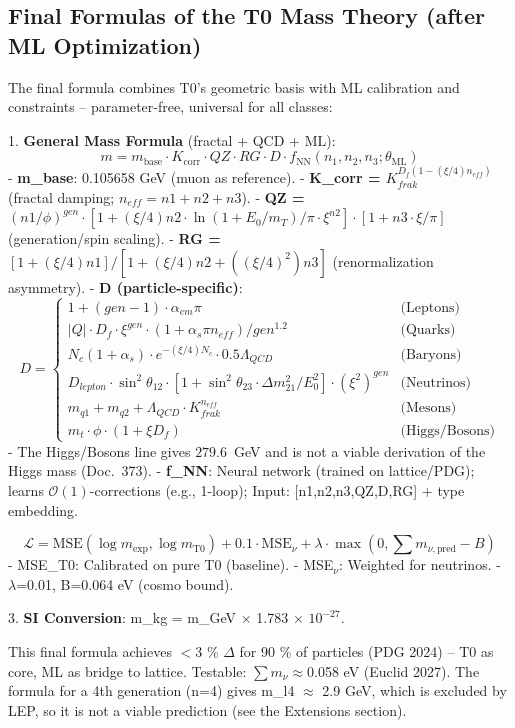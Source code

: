 	\subsection*{Final Formulas of the T0 Mass Theory (after ML Optimization)}
	The final formula combines T0's geometric basis with ML calibration and constraints – parameter-free, universal for all classes:
	
	1. \textbf{General Mass Formula} (fractal + QCD + ML):
	\[
	\boxed{m = m_{\text{base}} \cdot K_{\text{corr}} \cdot QZ \cdot RG \cdot D \cdot f_{\text{NN}}(n_1, n_2, n_3; \theta_{\text{ML}})}
	\]
	- \textbf{m\_base}: 0.105658 GeV (muon as reference).
	- \textbf{K\_corr = $K_{frak}^{D_f (1 - (\xi/4) n_{eff})}$} (fractal damping; $n_{eff} = n1 + n2 + n3$).
	- \textbf{QZ = $(n1 / \phi)^{gen} \cdot [1 + (\xi/4) n2 \cdot \ln(1 + E_0 / m_T) / \pi \cdot \xi^{n2}] \cdot [1 + n3 \cdot \xi / \pi]$} (generation/spin scaling).
	- \textbf{RG = $[1 + (\xi/4) n1] / [1 + (\xi/4) n2 + ((\xi/4)^2) n3]$} (renormalization asymmetry).
	- \textbf{D (particle-specific)}:
	\[
	D =
	\begin{cases}
		1 + (gen - 1) \cdot \alpha_{em} \pi & \text{(Leptons)} \\
		|Q| \cdot D_f \cdot \xi^{gen} \cdot (1 + \alpha_s \pi n_{eff}) / gen^{1.2} & \text{(Quarks)} \\
		N_c (1 + \alpha_s) \cdot e^{-(\xi/4) N_c} \cdot 0.5 \Lambda_{QCD} & \text{(Baryons)} \\
		D_{lepton} \cdot \sin^2 \theta_{12} \cdot [1 + \sin^2 \theta_{23} \cdot \Delta m^2_{21} / E_0^2] \cdot (\xi^2)^{gen} & \text{(Neutrinos)} \\
		m_{q1} + m_{q2} + \Lambda_{QCD} \cdot K_{frak}^{n_{eff}} & \text{(Mesons)} \\
		m_t \cdot \phi \cdot (1 + \xi D_f) & \text{(Higgs/Bosons)}
	\end{cases}
	\]
	- The Higgs/Bosons line gives $279.6$~GeV and is not a viable derivation of the Higgs mass (Doc.~373).
	- \textbf{f\_NN}: Neural network (trained on lattice/PDG); learns $\mathcal{O}(1)$-corrections (e.g., 1-loop); Input: [n1,n2,n3,QZ,D,RG] + type embedding.
	
	\[
	\mathcal{L} = \text{MSE}(\log m_{\exp}, \log m_{\text{T0}}) + 0.1 \cdot \text{MSE}_{\nu} + \lambda \cdot \max(0, \sum m_{\nu, \text{pred}} - B)
	\]
	- MSE\_T0: Calibrated on pure T0 (baseline).
	- MSE$_{\nu}$: Weighted for neutrinos.
	- $\lambda$=0.01, B=0.064 eV (cosmo bound).
	
	3. \textbf{SI Conversion}: m\_kg = m\_GeV $\times$ 1.783 $\times$ $10^{-27}$.
	
	This final formula achieves $<$3 \% $\Delta$ for 90 \% of particles (PDG 2024) – T0 as core, ML as bridge to lattice. Testable: $\sum m_{\nu} \approx$0.058 eV (Euclid 2027). The formula for a 4th generation (n=4) gives m\_l4 $\approx$ 2.9 GeV, which is excluded by LEP, so it is not a viable prediction (see the Extensions section).

